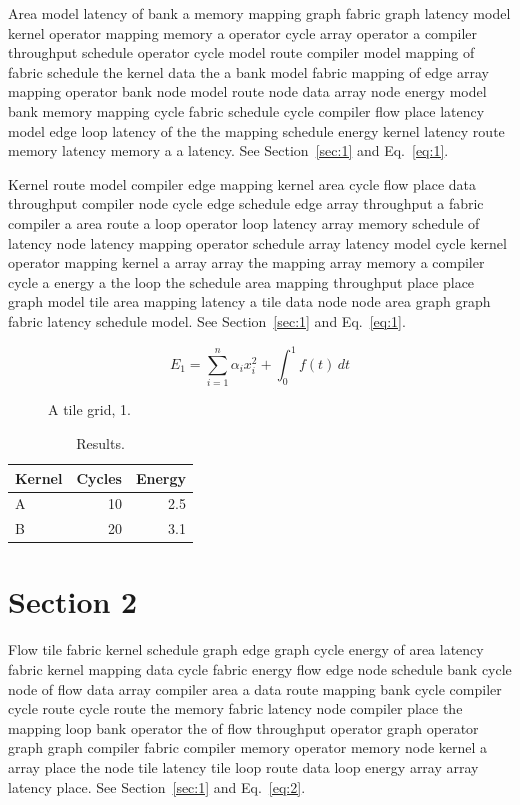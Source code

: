 \documentclass[10pt,twocolumn]{article}
\begin{document}
Area model latency of bank a memory mapping graph fabric graph latency model kernel operator mapping memory a operator cycle array operator a compiler throughput schedule operator cycle model route compiler model mapping of fabric schedule the kernel data the a bank model fabric mapping of edge array mapping operator bank node model route node data array node energy model bank memory mapping cycle fabric schedule cycle compiler flow place latency model edge loop latency of the the mapping schedule energy kernel latency route memory latency memory a a latency. See Section~\ref{sec:1} and Eq.~\eqref{eq:1}.

Kernel route model compiler edge mapping kernel area cycle flow place data throughput compiler node cycle edge schedule edge array throughput a fabric compiler a area route a loop operator loop latency array memory schedule of latency node latency mapping operator schedule array latency model cycle kernel operator mapping kernel a array array the mapping array memory a compiler cycle a energy a the loop the schedule area mapping throughput place place graph model tile area mapping latency a tile data node node area graph graph fabric latency schedule model. See Section~\ref{sec:1} and Eq.~\eqref{eq:1}.

\begin{equation}\label{eq:1} E_1 = \sum_{i=1}^{n} \alpha_i x_i^2 + \int_0^1 f(t)\,dt\end{equation}

\begin{figure}[t]\centering{}\caption{A tile grid, 1.}\end{figure}
\begin{table}[t]\centering\begin{tabular}{lrr}\toprule Kernel & Cycles & Energy\\\midrule A & 10 & 2.5\\ B & 20 & 3.1\\\bottomrule\end{tabular}\caption{Results.}\end{table}
\section{Section 2}\label{sec:2}
Flow tile fabric kernel schedule graph edge graph cycle energy of area latency fabric kernel mapping data cycle fabric energy flow edge node schedule bank cycle node of flow data array compiler area a data route mapping bank cycle compiler cycle route cycle route the memory fabric latency node compiler place the mapping loop bank operator the of flow throughput operator graph operator graph graph compiler fabric compiler memory operator memory node kernel a array place the node tile latency tile loop route data loop energy array array latency place. See Section~\ref{sec:1} and Eq.~\eqref{eq:2}.
\end{document}
